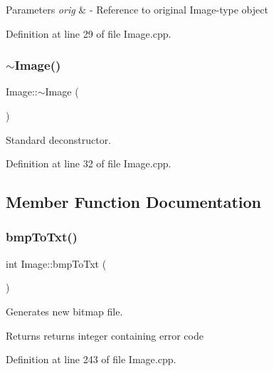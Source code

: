 \begin{DoxyParams}{Parameters}
{\em orig} & -\/ Reference to original Image-\/type object \\
\hline
\end{DoxyParams}


Definition at line 29 of file Image.\+cpp.

\mbox{\label{classImage_a0294f63700543e11c0f0da85601c7ae5}} 
\subsubsection{\texorpdfstring{$\sim$Image()}{~Image()}}
{\footnotesize\ttfamily Image\+::$\sim$\+Image (\begin{DoxyParamCaption}{ }\end{DoxyParamCaption})\hspace{0.3cm}{\ttfamily [virtual]}}

Standard deconstructor. 

Definition at line 32 of file Image.\+cpp.



\subsection{Member Function Documentation}
\mbox{\label{classImage_aa16c9acd068079c676dec4186262b1b7}} 
\subsubsection{\texorpdfstring{bmpToTxt()}{bmpToTxt()}}
{\footnotesize\ttfamily int Image\+::bmp\+To\+Txt (\begin{DoxyParamCaption}{ }\end{DoxyParamCaption})}



Generates new bitmap file. 

\begin{DoxyReturn}{Returns}
returns integer containing error code 
\end{DoxyReturn}


Definition at line 243 of file Image.\+cpp.

